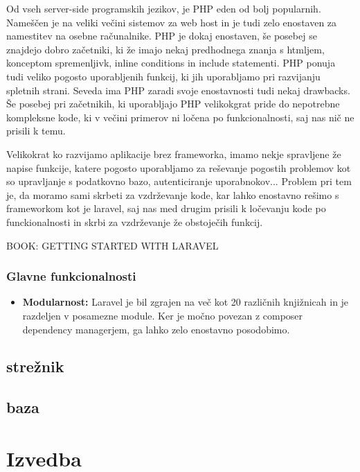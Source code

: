 \documentclass[12pt,a4paper,titlepage,openany]{report}
\begin{document}
Od vseh server-side programskih jezikov, je PHP eden od bolj popularnih. Nameščen je na veliki večini sistemov za web host in je tudi zelo enostaven za namestitev na osebne računalnike. PHP je dokaj enostaven, še posebej se znajdejo dobro začetniki, ki že imajo nekaj predhodnega znanja s htmljem, konceptom spremenljivk, inline conditions in include statementi. PHP ponuja tudi veliko pogosto uporabljenih funkcij, ki jih uporabljamo pri razvijanju spletnih strani. Seveda ima PHP zaradi svoje enostavnosti tudi nekaj drawbacks. Še posebej pri začetnikih, ki uporabljajo PHP velikokgrat pride do nepotrebne kompleksne kode, ki v večini primerov ni ločena po funkcionalnosti, saj nas nič ne prisili k temu. 

Velikokrat ko razvijamo aplikacije brez frameworka, imamo nekje spravljene že napise funkcije, katere pogosto uporabljamo za reševanje pogostih problemov kot so upravljanje s podatkovno bazo, autenticiranje uporabnokov... Problem pri tem je, da moramo sami skrbeti za vzdrževanje kode, kar lahko enostavno rešimo s frameworkom kot je laravel, saj nas med drugim prisili k ločevanju kode po funckionalnosti in skrbi za vzdrževanje že obstoječih funkcij.

BOOK: GETTING STARTED WITH LARAVEL

\subsection{Glavne funkcionalnosti}

\begin{itemize}
\item \textbf{Modularnost:} Laravel je bil zgrajen na več kot 20 različnih knjižnicah in je razdeljen v posamezne module. Ker je močno povezan z composer dependency managerjem, ga lahko zelo enostavno posodobimo.
\end{itemize}


\section{strežnik}

\section{baza}

\chapter{Izvedba}
\thispagestyle{fancy}
\end{document}
